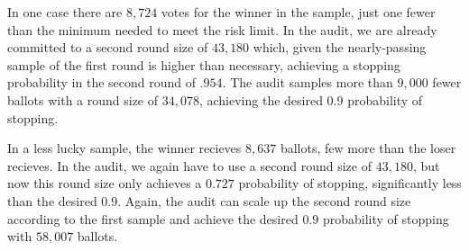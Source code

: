In one case there are $8,724$ votes for the winner in the sample, just one fewer than the minimum needed to meet the risk limit. In the \Minerva audit, we are already committed to a second round size of $43,180$ which, given the nearly-passing sample of the first round is higher than necessary, achieving a stopping probability in the second round of $.954$. The \Providence audit samples more than $9,000$ fewer ballots with a round size of $34,078$, achieving the desired $0.9$ probability of stopping.

In a less lucky sample, the winner recieves $8,637$ ballots, few more than the loser recieves. In the \Minerva audit, we again have to use a second round size of $43,180$, but now this round size only achieves a $0.727$ probability of stopping, significantly less than the desired $0.9$. Again, the \Providence audit can scale up the second round size according to the first sample and achieve the desired $0.9$ probability of stopping with $58,007$ ballots. 






% 
% 

